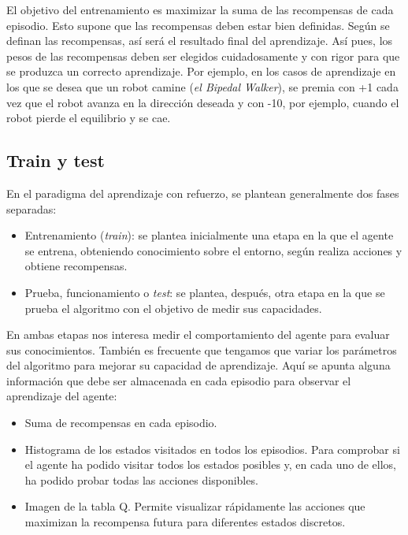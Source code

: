 \documentclass{article}
\begin{document}
El objetivo del entrenamiento es maximizar la suma de las recompensas de cada episodio. Esto supone que las recompensas deben estar bien definidas. Según se definan las recompensas, así será el resultado final del aprendizaje.  Así pues, los pesos de las recompensas deben ser elegidos cuidadosamente y con rigor para que se produzca un correcto aprendizaje. Por ejemplo, en los casos de aprendizaje en los que se desea que un robot camine (\textit{el Bipedal Walker}), se premia con +1 cada vez que el robot avanza en la dirección deseada y con -10, por ejemplo, cuando el robot pierde el equilibrio y se cae.



\subsection{Train y test}
En el paradigma del aprendizaje con refuerzo, se plantean generalmente dos fases separadas: 
\begin{itemize}
    \item Entrenamiento (\textit{train}): se plantea inicialmente una etapa en la que el agente se entrena, obteniendo conocimiento sobre el entorno, según realiza acciones y obtiene recompensas.
    
\item Prueba, funcionamiento o \textit{test}: se plantea, después, otra etapa en la que se prueba el algoritmo con el objetivo de medir sus capacidades.
\end{itemize}

En ambas etapas nos interesa medir el comportamiento del agente para evaluar sus conocimientos. También es frecuente que tengamos que variar los parámetros del algoritmo para mejorar su capacidad de aprendizaje. Aquí se apunta alguna información que debe ser almacenada en cada episodio para observar el aprendizaje del agente:
 \begin{itemize}
     \item Suma de recompensas en cada episodio.
     \item Histograma de los estados visitados en todos los episodios. Para comprobar si el agente ha podido visitar todos los estados posibles y, en cada uno de ellos, ha podido probar todas las acciones disponibles.

     \item Imagen de la tabla Q. Permite visualizar rápidamente las acciones que maximizan la recompensa futura para diferentes estados discretos.
 \end{itemize}
\end{document}
